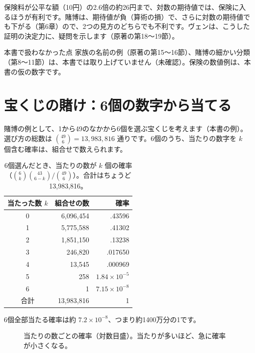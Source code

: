 \documentclass[a4paper,11pt,openany]{ltjsbook}
\begin{document}
保険料が公平な額（10円）の2.6倍の約26円まで、対数の期待値では、保険に入るほうが有利です。賭博は、期待値が負（算術の損）で、さらに対数の期待値でも下がる（第6章）ので、2つの見方のどちらでも不利です。ヴェンは、こうした証明の決定力に、疑問を示します（原著の第18〜19節）。

\begin{notebox}{本書で扱わなかった点}
家族の名前の例（原著の第15〜16節）、賭博の細かい分類（第8〜11節）は、本書では取り上げていません（未確認）。保険の数値例は、本書の仮の数字です。
\end{notebox}

\section{宝くじの賭け：6個の数字から当てる}

賭博の例として、1から49のなかから6個を選ぶ宝くじを考えます（本書の例）。選び方の総数は $\binom{49}{6}=13{,}983{,}816$ 通りです。6個のうち、当たりの数字を $k$ 個含む確率は、組合せで数えられます。

\begin{table}[htbp]
\centering
\begin{tabular}{c|rr}
\toprule
当たった数 $k$ & 組合せの数 & 確率\\
\midrule
0 & 6,096,454 & .43596\\
1 & 5,775,588 & .41302\\
2 & 1,851,150 & .13238\\
3 & 246,820 & .017650\\
4 & 13,545 & .000969\\
5 & 258 & $1.84\times10^{-5}$\\
6 & 1 & $7.15\times10^{-8}$\\
\midrule
合計 & 13,983,816 & 1\\
\bottomrule
\end{tabular}
\caption{6個選んだとき、当たりの数が $k$ 個の確率（$\binom6k\binom{43}{6-k}\big/\binom{49}6$）。合計はちょうど 13,983,816。}
\end{table}

6個全部当たる確率は約 $7.2\times10^{-8}$、つまり約1400万分の1です。

\begin{figure}[htbp]
\centering
{}
\caption{当たりの数ごとの確率（対数目盛）。当たりが多いほど、急に確率が小さくなる。}
\end{figure}
\end{document}
